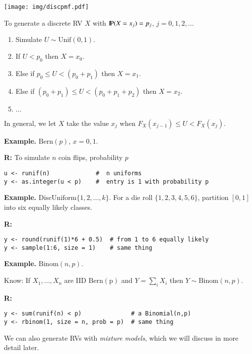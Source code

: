 \documentclass[captions=tableheading]{scrbook}
\begin{document}
\begin{itemize}
\begin{center}
\texttt{[image: img/discpmf.pdf]}

\end{center}

To generate a discrete RV $X$ with $\P(X=x_{j})=p_{j}$, $j=0,1,2,\ldots$

\begin{enumerate}
\item Simulate $U \sim \mathrm{Unif}(0,1)$.
\item If $U<p_{0}$ then $X=x_{0}$.
\item Else if $p_{0}\leq U<(p_{0}+p_{1})$ then $X=x_{1}$.
\item Else if $(p_{0}+p_{1})\leq U<(p_{0}+p_{1}+p_{2})$ then $X=x_{2}$.
\item $\ldots$
\end{enumerate}
 
In general, we let $X$ take the value $x_{j}$ when $F_{X}(x_{j-1})\leq U<F_{X}(x_{j})$.

\textbf{Example.} $\mathrm{Bern}(p)$, $x=0,1$.
 
\textbf{R:} To simulate $n$ coin flips, probability $p$

\begin{verbatim}
u <- runif(n)             #  n uniforms
y <- as.integer(u < p)    #  entry is 1 with probability p
\end{verbatim}


\textbf{Example.} $\mathrm{DiscUniform}\{1,2,\ldots,k\}$.  For a die roll $\{1,2,3,4,5,6\}$, partition $[0,1]$ into six equally likely classes.

\textbf{R:}
\begin{verbatim}
y <- round(runif(1)*6 + 0.5)  # from 1 to 6 equally likely
y <- sample(1:6, size = 1)    # same thing
\end{verbatim}


\textbf{Example.} $\mathrm{Binom}(n,p)$.
 
Know: If $X_{1},\ldots,X_{n}$ are IID $\mathrm{Bern(p)}$ and $Y=\sum_{i}X_{i}$ then $Y\sim\mathrm{Binom}(n,p)$.

\textbf{R:}
\begin{verbatim}
y <- sum(runif(n) < p)              # a Binomial(n,p)
y <- rbinom(1, size = n, prob = p)  # same thing
\end{verbatim}

We can also generate RVs with \emph{mixture models}, which we will discuss in more detail later.

\end{itemize} %
\end{document}
